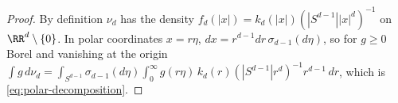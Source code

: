 \begin{proof}
\leanok
By definition $\nu_d$ has the density $f_d(|x|) = k_d(|x|)(|S^{d-1}||x|^d)^{-1}$ on
$\RR^d \setminus \{0\}$. In polar coordinates $x = r\eta$, $dx = r^{d-1}dr\,\sigma_{d-1}(d\eta)$, so
for $g \ge 0$ Borel and vanishing at the origin
$\int g\,d\nu_d = \int_{S^{d-1}}\sigma_{d-1}(d\eta)\int_0^\infty g(r\eta)\,
k_d(r)(|S^{d-1}|r^d)^{-1}r^{d-1}\,dr$, which is \ref{eq:polar-decomposition}.
\end{proof}


